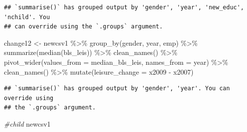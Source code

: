 \documentclass[
]{article}
\newenvironment{Shaded}{\begin{snugshade}}{\end{snugshade}}
\newcommand{\AttributeTok}[1]{\textcolor[rgb]{0.77,0.63,0.00}{#1}}
\newcommand{\CommentTok}[1]{\textcolor[rgb]{0.56,0.35,0.01}{\textit{#1}}}
\newcommand{\FunctionTok}[1]{\textcolor[rgb]{0.00,0.00,0.00}{#1}}
\newcommand{\NormalTok}[1]{#1}
\newcommand{\OtherTok}[1]{\textcolor[rgb]{0.56,0.35,0.01}{#1}}
\newcommand{\SpecialCharTok}[1]{\textcolor[rgb]{0.00,0.00,0.00}{#1}}
\begin{document}
\begin{verbatim}
## `summarise()` has grouped output by 'gender', 'year', 'new_educ', 'nchild'. You
## can override using the `.groups` argument.
\end{verbatim}

\begin{Shaded}
\begin{Highlighting}[]
\NormalTok{change12 }\OtherTok{\textless{}{-}}\NormalTok{ newcsv1 }\SpecialCharTok{\%\textgreater{}\%}
  \FunctionTok{group\_by}\NormalTok{(gender,  year, emp) }\SpecialCharTok{\%\textgreater{}\%}
  \FunctionTok{summarize}\NormalTok{(}\FunctionTok{median}\NormalTok{(bls\_leis)) }\SpecialCharTok{\%\textgreater{}\%}
  \FunctionTok{clean\_names}\NormalTok{() }\SpecialCharTok{\%\textgreater{}\%}
  \FunctionTok{pivot\_wider}\NormalTok{(}\AttributeTok{values\_from =}\NormalTok{ median\_bls\_leis, }\AttributeTok{names\_from =}\NormalTok{ year) }\SpecialCharTok{\%\textgreater{}\%}
  \FunctionTok{clean\_names}\NormalTok{() }\SpecialCharTok{\%\textgreater{}\%}
  \FunctionTok{mutate}\NormalTok{(}\AttributeTok{leisure\_change =}\NormalTok{ x2009 }\SpecialCharTok{{-}}\NormalTok{ x2007)}
\end{Highlighting}
\end{Shaded}

\begin{verbatim}
## `summarise()` has grouped output by 'gender', 'year'. You can override using
## the `.groups` argument.
\end{verbatim}

\begin{Shaded}
\begin{Highlighting}[]
\CommentTok{\#child}
\NormalTok{newcsv1}
\end{Highlighting}
\end{Shaded}
\end{document}
